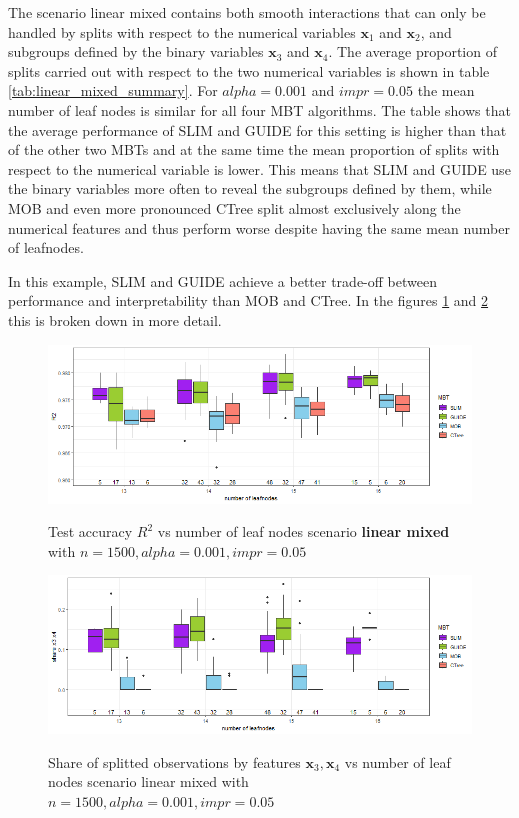 The scenario linear mixed contains both smooth interactions that can only be handled by splits with respect to the numerical variables $\textbf{x}_1$ and $\textbf{x}_2$, and subgroups defined by the binary variables $\textbf{x}_3$ and $\textbf{x}_4$. 
The average proportion of splits carried out with respect to the two numerical variables is shown in table \ref{tab:linear_mixed_summary}.
For $alpha = 0.001$ and $impr = 0.05$ the mean number of leaf nodes is similar for all four MBT algorithms. The table shows that the average performance of SLIM and GUIDE for this setting is higher than that of the other two MBTs and at the same time the mean proportion of splits with respect to the numerical variable is lower.  This means that SLIM and GUIDE use the binary variables more often to reveal the subgroups defined by them, while MOB and even more pronounced CTree split almost exclusively along the numerical features and thus perform worse despite having the same mean number of leafnodes. 

In this example, SLIM and GUIDE achieve a better trade-off between performance and interpretability than MOB and CTree.
In the figures \ref{fig:lm_1000_standalone_r2_test}  and \ref{fig:lm_1000_standalone_share_x3x4} this is broken down in more detail.


\begin{figure}[!htb]
\centering
    \includegraphics[width=14cm]{Figures/simulations/batchtools/basic_scenarios/linear_mixed/lm_1000_standalone_r2_test.png}
    \label{fig:lm_1000_standalone_r2_test}
    \caption{Test accuracy $R^2$ vs number of leaf nodes scenario
\textbf{linear mixed} with $n=1500, alpha = 0.001, impr = 0.05$}
\end{figure} 


\begin{figure}[!htb]
\centering
    \includegraphics[width=14cm]{Figures/simulations/batchtools/basic_scenarios/linear_mixed/lm_1000_standalone_share_x3x4.png}
    \label{fig:lm_1000_standalone_share_x3x4}
    \caption{Share of splitted observations by features $\textbf{x}_3, \textbf{x}_4$ vs number of leaf nodes scenario linear mixed with $n=1500, alpha = 0.001, impr = 0.05$}
\end{figure} 




